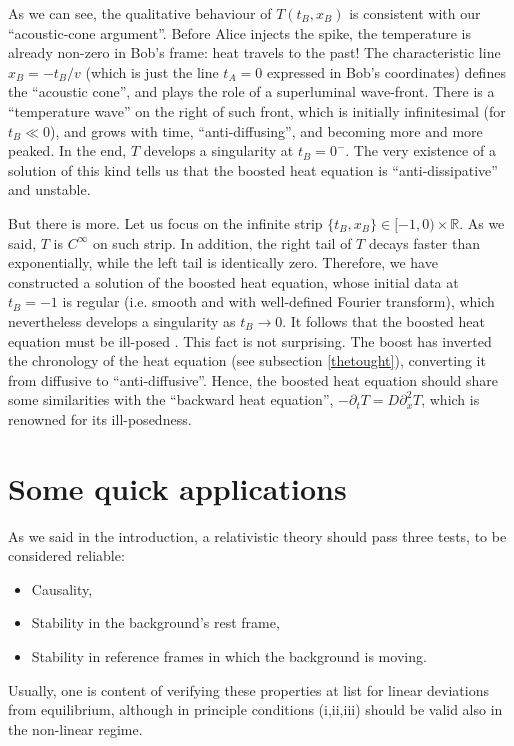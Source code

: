 \documentclass[a4paper, amsfonts, amssymb, amsmath, reprint, showkeys,  twoside, onecolumn,notitlepage,nofootinbib]{revtex4-1}
\theoremstyle{definition}
\theoremstyle{theorem}
\begin{document}
As we can see, the qualitative behaviour of $T(t_B,x_B)$ is consistent with our ``acoustic-cone argument''. Before Alice injects the spike, the temperature is already non-zero in Bob's frame: heat travels to the past! The characteristic line $x_B=-t_B/v$ (which is just the line $t_A=0$ expressed in Bob's coordinates) defines the ``acoustic cone'', and plays the role of a superluminal wave-front. There is a ``temperature wave'' on the right of such front, which is initially infinitesimal (for $t_B \ll 0$), and grows with time, ``anti-diffusing'', and becoming more and more peaked. In the end, $T$ develops a singularity at $t_B=0^-$. The very existence of a solution of this kind tells us that the boosted heat equation is ``anti-dissipative'' and unstable. 

But there is more. Let us focus on the infinite strip $ \{ t_B, x_B \} \in [-1,0) \times \mathbb{R}$. As we said, $T$ is $C^\infty$ on such strip. In addition, the right tail of $T$ decays faster than exponentially, while the left tail is identically zero. Therefore, we have constructed a solution of the boosted heat equation, whose initial data at $t_B =-1$ is regular (i.e. smooth and with well-defined Fourier transform), which nevertheless develops a singularity as $t_B \rightarrow 0$. It follows that the boosted heat equation must be ill-posed \cite{Kost2000}. This fact is not surprising. The boost has inverted the chronology of the heat equation (see subsection \ref{thetought}), converting it from diffusive to ``anti-diffusive''. Hence, the boosted heat equation should share some similarities with the ``backward heat equation'', $-\partial_t T = D \partial_x^2 T$, which is renowned for its ill-posedness. 



\section{Some quick applications}\label{apliacia}


As we said in the introduction, a relativistic theory should pass three tests, to be considered reliable:
\begin{itemize}
\item[(i)] Causality,
\item[(ii)] Stability in the background's rest frame,
\item[(iii)] Stability in reference frames in which the background is moving.
\end{itemize}
Usually, one is content of verifying these properties at list for linear deviations from equilibrium, although in principle conditions (i,ii,iii) should be valid also in the non-linear regime.
\end{document}
